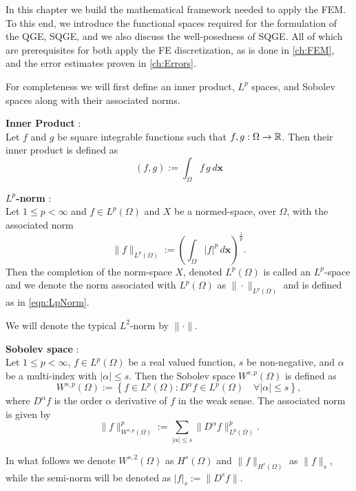 In this chapter we build the mathematical framework needed to apply the FEM. To
this end, we introduce the functional spaces required for the formulation of the
QGE, SQGE, and we also discuss the well-posedness of SQGE. All of which are
prerequisites for both apply the FE discretization, as is done in
\autoref{ch:FEM}, and the error estimates proven in \autoref{ch:Errors}.

For completeness we will first define an inner product, $L^p$ spaces, and
Sobolev spaces along with their associated norms.

\begin{definition} \label{def:InnerProduct}
  \textbf{Inner Product} \cite{Kreyszig1989}: \\
  Let $f$ and $g$ be square integrable functions such that $f,g : \Omega
  \rightarrow \mathbb{R}$.  Then their inner product is defined as
  \begin{equation}
    (f,g) := \int_{\Omega}\! f \, g\, d\mathbf{x}
    \label{eqn:InnerProduct}
  \end{equation}
\end{definition}

\begin{definition} \label{def:LpNorm}
  \textbf{$L^p$-norm} \cite{Kreyszig1989}: \\
  Let $1\le p < \infty$ and $f \in L^p(\Omega)$ and $X$ be a normed-space, over
  $\Omega$, with the associated norm
  \begin{equation}
    \|f\|_{L^p(\Omega)} := \left(\int_{\Omega}\! |f|^p\, d\mathbf{x}\right)^{\frac{1}{p}}.
    \label{eqn:LpNorm}
  \end{equation}
  Then the completion of the norm-space $X$, denoted $L^p(\Omega)$ is called an
  $L^p$-space and we denote the norm associated with $L^p(\Omega)$ as
  $\|\cdot\|_{L^p(\Omega)}$ and is defined as in \eqref{eqn:LpNorm}.
\end{definition}
We will denote the typical $L^2$-norm by $\|\cdot\|$.

\begin{definition} \label{SobolevSpace}
  \textbf{Sobolev space} \cite{Evans1989}: \\
  Let $1\le p < \infty$, $f \in L^p(\Omega)$ be a real valued function, $s$ be
  non-negative, and $\alpha$ be a multi-index with $|\alpha| \le s$. Then the
  Sobolev space $W^{s,p}(\Omega)$ is defined as
  \begin{equation}
    W^{s,p}(\Omega) := \left\{ f\in L^p(\Omega) : D^{\alpha} f \in
      L^p(\Omega)\quad \forall |\alpha| \le s\right\},
    \label{eqn:Sobolev}
  \end{equation}
  where $D^{\alpha}f$ is the order $\alpha$ derivative of $f$ in the weak sense.
  The associated norm is given by
  \begin{equation}
    \|f\|_{W^{s,p}(\Omega)}^p := \sum_{|\alpha|\le s}
      \|D^{\alpha}f\|_{L^p(\Omega)}^p.
    \label{eqn:HkpNorm}
  \end{equation}
\end{definition}
In what follows we denote $W^{s,2}(\Omega)$ as $H^s(\Omega)$ and
$\|f\|_{H^s(\Omega)}$ as $\|f\|_s$, while the semi-norm will be denoted
as $|f|_s := \|D^s f\|$.
